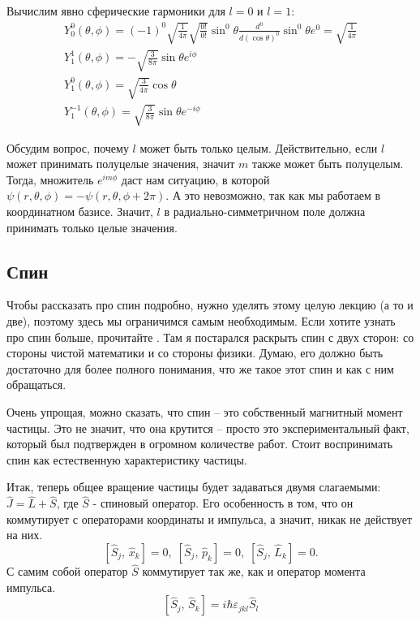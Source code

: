 Вычислим явно сферические гармоники для $l=0$ и $l=1$:
\begin{gather*}
Y^0_0(\theta,\phi) = (-1)^0\sqrt{\frac{1}{4\pi}}\sqrt{\frac{0!}{0!}}\sin^0\theta \frac{d^0}{d(\cos\theta)^0} \sin^0 \theta e^{0} = \sqrt{\frac{1}{4\pi}}\\
Y^1_1(\theta,\phi) = -\sqrt{\frac{3}{8\pi}}\sin\theta e^{i\phi}\\
Y^0_1(\theta,\phi) = \sqrt{\frac{3}{4\pi}}\cos\theta\\
Y^{-1}_1(\theta,\phi) = \sqrt{\frac{3}{8\pi}}\sin\theta e^{-i\phi}
\end{gather*}

Обсудим вопрос, почему $l$ может быть только целым. Действительно, если $l$ может принимать полуцелые значения, значит $m$ также может быть полуцелым. Тогда, множитель $e^{im\phi}$ даст нам ситуацию, в которой $\psi(r, \theta, \phi) = -\psi(r, \theta, \phi + 2\pi)$. А это невозможно, так как мы работаем в координатном базисе. Значит, $l$ в радиально-симметричном поле должна принимать только целые значения.

\subsection{Спин}
\hspace{1em} Чтобы рассказать про спин подробно, нужно уделять этому целую лекцию (а то и две), поэтому здесь мы ограничимся самым необходимым. Если хотите узнать про спин больше, прочитайте . Там я постарался раскрыть спин с двух сторон: со стороны чистой математики и со стороны физики. Думаю, его должно быть достаточно для более полного понимания, что же такое этот спин и как с ним обращаться.

Очень упрощая, можно сказать, что спин -- это собственный магнитный момент частицы. Это не значит, что она крутится -- просто это экспериментальный факт, который был подтвержден в огромном количестве работ. Стоит воспринимать спин как естественную характеристику частицы.

Итак, теперь общее вращение частицы будет задаваться двумя слагаемыми: $\hat{J} = \hat{L} + \hat{S}$, где $\hat{S}$ - спиновый оператор. Его особенность в том, что он коммутирует с операторами координаты и импульса, а значит, никак не действует на них.
\[
\left[\hat{S}_j, \, \hat{x}_k\right] = 0,\; \left[\hat{S}_j, \, \hat{p}_k\right] = 0,\; \left[\hat{S}_j, \, \hat{L}_k\right] = 0.
\]
С самим собой оператор $\hat{S}$ коммутирует так же, как и оператор момента импульса.
\[
\left[\hat{S}_j, \, \hat{S}_k\right] = i\hbar\varepsilon_{jkl}\hat{S}_l
\]


